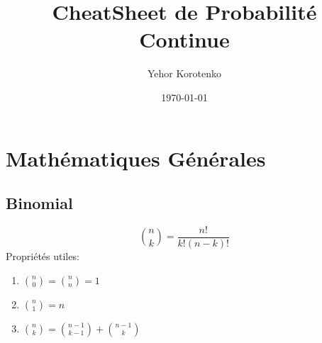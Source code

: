\documentclass[a4paper]{article}
\title{CheatSheet de Probabilité Continue}
\author{Yehor Korotenko}
\date{\today}
\begin{document}
\maketitle
\section{Mathématiques Générales} 
\subsection{Binomial}
\[
    \binom{n}{k} = \frac{n!}{k!(n-k)!}
\] 
Propriétés utiles:
\begin{enumerate}
    \item $\binom{n}{0} = \binom{n}{n} = 1$
    \item $\binom{n}{1} = n$ 
    \item $\binom{n}{k} = \binom{n-1}{k-1} + \binom{n-1}{k}$
\end{enumerate}
\end{document}
